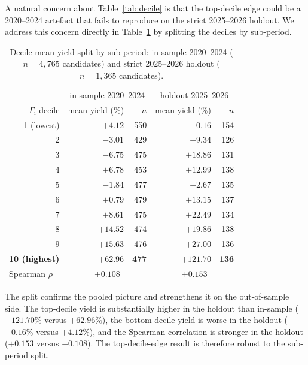 \documentclass[11pt]{article}
\theoremstyle{definition}
\theoremstyle{remark}
\newcommand{\GROUND}{\Gamma_{\mathrm{i}}}
\begin{document}
A natural concern about Table~\ref{tab:decile} is that the
top-decile edge could be a 2020--2024 artefact that fails to
reproduce on the strict 2025--2026 holdout. We address this
concern directly in Table~\ref{tab:decile-split} by splitting the
deciles by sub-period.

\begin{table}[htbp]
\centering
\small
\begin{tabular}{r rr rr}
\toprule
 & \multicolumn{2}{c}{in-sample 2020--2024} & \multicolumn{2}{c}{holdout 2025--2026} \\
$\GROUND$ decile & mean yield (\%) & $n$ & mean yield (\%) & $n$ \\
\midrule
1 (lowest)  & $+4.12$  & 550 & $-0.16$  & 154 \\
2           & $-3.01$  & 429 & $-9.34$  & 126 \\
3           & $-6.75$  & 475 & $+18.86$ & 131 \\
4           & $+6.78$  & 453 & $+12.99$ & 138 \\
5           & $-1.84$  & 477 & $+2.67$  & 135 \\
6           & $+0.79$  & 479 & $+13.15$ & 137 \\
7           & $+8.61$  & 475 & $+22.49$ & 134 \\
8           & $+14.52$ & 474 & $+19.86$ & 138 \\
9           & $+15.63$ & 476 & $+27.00$ & 136 \\
\textbf{10 (highest)} & $\mathbf{+62.96}$ & \textbf{477} & $\mathbf{+121.70}$ & \textbf{136} \\
\midrule
\multicolumn{1}{l}{Spearman $\rho$} & \multicolumn{2}{c}{$+0.108$} & \multicolumn{2}{c}{$+0.153$} \\
\bottomrule
\end{tabular}
\caption{Decile mean yield split by sub-period: in-sample 2020--2024 ($n = 4{,}765$ candidates) and strict 2025--2026 holdout ($n = 1{,}365$ candidates).}
\label{tab:decile-split}
\end{table}

The split confirms the pooled picture and strengthens it on the
out-of-sample side. The top-decile yield is substantially higher in the holdout
than in-sample ($+121.70\%$ versus $+62.96\%$), the bottom-decile
yield is worse in the holdout ($-0.16\%$ versus $+4.12\%$), and
the Spearman correlation is stronger in the holdout
($+0.153$ versus $+0.108$). The top-decile-edge result is
therefore robust to the sub-period split.
\end{document}
